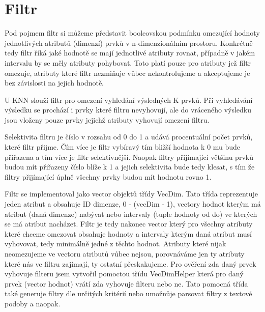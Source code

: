 \documentclass[czech,semestral,dept460,male,csharp,cpdeclaration]{diploma}
\begin{document}
		
	
	\chapter{Filtr}
	
		Pod pojmem filtr si můžeme představit booleovskou podmínku omezující hodnoty jednotlivých atributů (dimenzí) prvků v n-dimenzionálním prostoru. Konkrétně tedy filtr říká jaké hodnotě se mají jednotlivé atributy rovnat, případně v jakém intervalu by se měly atributy pohybovat. Toto platí pouze pro atributy jež filtr omezuje, atributy které filtr nezmiňuje vůbec nekontrolujeme a akceptujeme je bez závislosti na jejich hodnotě.
		
		U KNN slouží filtr pro omezení vyhledání výsledných K prvků. Při vyhledávání výsledku se prochází i prvky které filtru nevyhovují, ale do vráceného výsledku jsou vloženy pouze prvky jejichž atributy vyhovují omezení filtru.
		
		Selektivita filtru je číslo v rozsahu od 0 do 1 a udává procentuální počet prvků, které filtr přijme. Čím více je filtr vybíravý tím bližší hodnota k 0 mu bude přiřazena a tím více je filtr selektivnější. Naopak filtry přijímající většinu prvků budou mít přiřazeny číslo blíže k 1 a jejich selektivita bude tedy klesat, s tím že filtry přijímající úplně všechny prvky budou mít hodnotu rovno 1.
		
		Filtr se implementoval jako vector objektů třídy VecDim. Tato třída reprezentuje jeden atribut a obsahuje ID dimenze, 0 - (vecDim - 1), vectory hodnot kterým má atribut (daná dimenze) nabývat nebo intervaly (tuple hodnoty od do) ve kterých se má atribut nacházet. Filtr je tedy nakonec vector který pro všechny atributy které chceme omezovat obsahuje hodnoty a intervaly kterým daná atribut musí vyhovovat, tedy minimálně jedné z těchto hodnot. Atributy které nijak neomezujeme ve vectoru atributů vůbec nejsou, porovnáváme jen ty atributy které nás ve filtru zajímají, ty ostatní přeskakujeme. Pro ověření zda daný prvek vyhovuje filteru jsem vytvořil pomoctou třídu VecDimHelper která pro daný prvek (vector hodnot) vrátí zda vyhovuje filteru nebo ne. Tato pomocná třída také generuje filtry dle určitých kritérií nebo umožnůje parsovat filtry z textové podoby a naopak.
		
\end{document}
